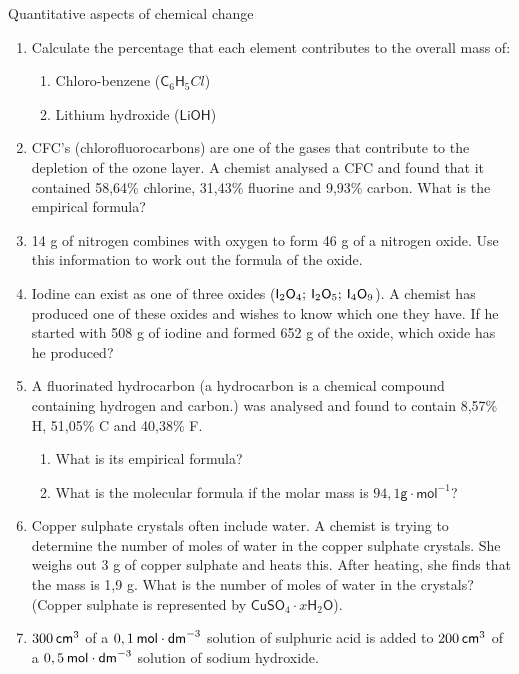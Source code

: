 \begin{eocexercises}{Quantitative aspects of chemical change}
\begin{enumerate}[noitemsep, label=\textbf{\arabic*}. ]
\item Calculate the percentage that each element contributes to the overall mass of:
\label{m38712*id6334}\begin{enumerate}[noitemsep, label=\textbf{\alph*}. ] 
            \item Chloro-benzene (${\mathsf{C}}_{6}{\mathsf{H}}_{5}Cl$)\item Lithium hydroxide ($\mathsf{LiOH}$)\end{enumerate}
\item CFC's (chlorofluorocarbons) are one of the gases that contribute to the depletion of the ozone layer. A chemist analysed a CFC and found that it contained 58,64\% chlorine, 31,43\% fluorine and 9,93\% carbon. What is the empirical formula?\newline
\item 14 g of nitrogen combines with oxygen to form 46 g of a nitrogen oxide. Use this information to work out the formula of the oxide.\newline
            \item Iodine can exist as one of three oxides (${\mathsf{I}}_{2}{\mathsf{O}}_{4};\phantom{\rule{2pt}{0ex}}{\mathsf{I}}_{2}{\mathsf{O}}_{5};\phantom{\rule{2pt}{0ex}}{\mathsf{I}}_{4}{\mathsf{O}}_{9}$). A chemist has produced one of these oxides and wishes to know which one they have. If he started with 508 g of iodine and formed 652 g of the oxide, which oxide has he produced?\newline
            \item A fluorinated hydrocarbon (a hydrocarbon is a chemical compound containing hydrogen and carbon.) was analysed and found to contain 8,57\% H, 51,05\% C and 40,38\% F.\label{m38712*id73222}\begin{enumerate}[noitemsep, label=\textbf{\alph*}. ] 
            \item What is its empirical formula?\item What is the molecular formula if the molar mass is $94,1\mathsf{g}\cdot {\mathsf{mol}}^{-1}$?\end{enumerate}
                \item Copper sulphate crystals often include water. A chemist is trying to determine the number of moles of water in the copper sulphate crystals. She weighs out 3 g of copper sulphate and heats this. After heating, she finds that the mass is 1,9 g. What is the number of moles of water in the crystals? (Copper sulphate is represented by ${\mathsf{CuSO}}_{4}\cdot x{\mathsf{H}}_{2}\mathsf{O}$).        \label{m38712*uid147}\item $300\phantom{\rule{2pt}{0ex}}{\mathsf{cm}}^{3}$ of a $0,1\phantom{\rule{2pt}{0ex}}\mathsf{mol}\ensuremath{\cdot}{\mathsf{dm}}^{-3}$ solution of sulphuric acid is added to $200\phantom{\rule{2pt}{0ex}}{\mathsf{cm}}^{3}$ of a $0,5\phantom{\rule{2pt}{0ex}}\mathsf{mol}\ensuremath{\cdot}{\mathsf{dm}}^{-3}$ solution of sodium hydroxide.

\end{enumerate}
\end{eocexercises}
